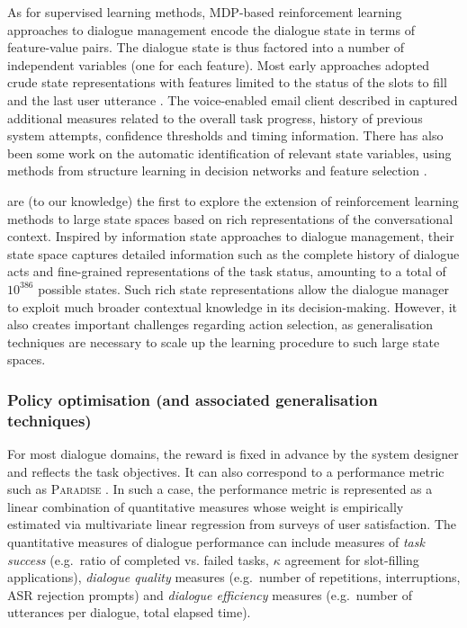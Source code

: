 As for supervised learning methods, MDP-based reinforcement learning approaches to dialogue management encode the dialogue state in terms of feature-value pairs.  The dialogue state is thus factored into a number of independent variables (one for each feature).  Most early approaches adopted crude state representations with features limited to the status of the slots to fill and the last user utterance \citep{817450,Singh:2000:EER:647288.723412,Scheffler:2002}.  The voice-enabled email client described in \cite{Walker:2000} captured additional measures related to the overall task progress, history of previous system attempts, confidence thresholds and timing information.  There has also been some work on the automatic identification of relevant state variables, using methods from structure learning in decision networks \citep{PaekC06} and feature selection \citep{tetreault2006using}. 

\cite{Henderson:2008} are (to our knowledge) the first to explore the extension of reinforcement learning methods to large state spaces based on rich representations of the conversational context. Inspired by information state approaches to dialogue management, their state space captures detailed information such as the complete history of dialogue acts and fine-grained representations of the task status, amounting to a total of $10^{386}$ possible states.  Such rich state representations allow the dialogue manager to exploit much broader contextual knowledge in its decision-making.  However, it also creates important challenges regarding action selection, as generalisation techniques are necessary to scale up the learning procedure to such large state spaces.

\subsubsection{Policy optimisation (and associated generalisation techniques)}

For most dialogue domains, the reward is fixed in advance by the system designer and reflects the task objectives.  It can also correspond to a performance metric such as \textsc{Paradise} \citep{Walker:2000}.  In such a case, the performance metric is represented as a linear combination of quantitative measures whose weight is empirically estimated via multivariate linear regression from surveys of user satisfaction.  The quantitative measures of dialogue performance can include measures of \textit{task success} (e.g.\ ratio of completed vs. failed tasks, $\kappa$ agreement for slot-filling applications), \textit{dialogue quality} measures (e.g.\ number of repetitions, interruptions, ASR rejection prompts) and \textit{dialogue efficiency} measures (e.g.\ number of utterances per dialogue, total elapsed time).

